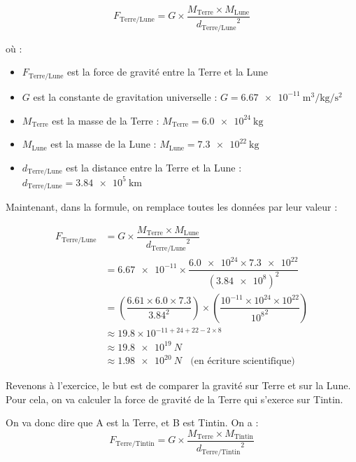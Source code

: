 \documentclass[../Cours.tex]{subfiles}
\begin{document}
$$F_{\mbox{Terre/Lune}} = G \times \dfrac{M_{\mbox{Terre}} \times M_{\mbox{Lune}}}{{d_{\mbox{Terre/Lune}}}^2}$$

où : 
\begin{itemize}
    \item $F_{\mbox{Terre/Lune}}$ est la force de gravité entre la Terre et la Lune
    \item $G$ est la constante de gravitation universelle : $G = \qty{6.67e-11}{\metre\cubed\per\kilo\gram\per\second\squared}$
    \item $M_{\mbox{Terre}}$ est la masse de la Terre : $M_{\mbox{Terre}} = \qty{6.0e24}{\kilo\gram}$
    \item $M_{\mbox{Lune}}$ est la masse de la Lune : $M_{\mbox{Lune}} = \qty{7.3e22}{\kilo\gram}$
    \item $d_{\mbox{Terre/Lune}}$ est la distance entre la Terre et la Lune : $d_{\mbox{Terre/Lune}} = \qty{3.84e5}{\kilo\metre}$ 
\end{itemize}

Maintenant, dans la formule, on remplace toutes les données par leur valeur : 

\begin{align*}
    F_{\mbox{Terre/Lune}} &= G \times \dfrac{M_{\mbox{Terre}} \times M_{\mbox{Lune}}}{{d_{\mbox{Terre/Lune}}}^2} \\
    &= \num{6.67e-11} \times \dfrac{\num{6.0e24} \times \num{7.3e22}}{\left(\num{3.84e8}\right)^2} \\
    &= \left( \dfrac{ \num{6.61} \times \num{6.0} \times \num{7.3} }{ \num{3.84}^2 } \right) \times \left( \dfrac{ 10^{-11} \times 10^{24} \times 10^{22} }{ {10^8}^2 } \right) \\
    &\approx \num{19.8} \times 10^{-11+24+22-2 \times 8} \\
    &\approx \qty{19.8e19}{N}\\
    &\approx \qty{1.98e20}{N} ~~~~\mbox{(en écriture scientifique)}
\end{align*}

\clearpage
Revenons à l'exercice, le but est de comparer la gravité sur Terre et sur la Lune. Pour cela, on va calculer la force de gravité de la Terre qui s'exerce sur Tintin.

On va donc dire que A est la Terre, et B est Tintin. On a : 
$$F_{\mbox{Terre/Tintin}} = G \times \dfrac{M_{\mbox{Terre}} \times M_{\mbox{Tintin}}}{{d_{\mbox{Terre/Tintin}}}^2}$$
\end{document}
